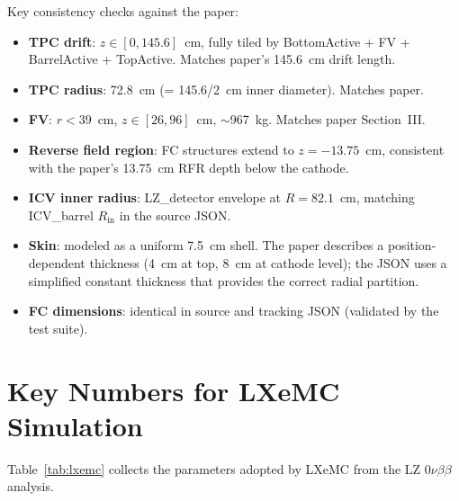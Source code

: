 \documentclass[11pt]{article}
\begin{document}
Key consistency checks against the paper:

\begin{itemize}
\item \textbf{TPC drift}: $z \in [0, 145.6]$~cm, fully tiled by
  BottomActive + FV + BarrelActive + TopActive.  Matches paper's
  145.6~cm drift length.

\item \textbf{TPC radius}: 72.8~cm (= 145.6/2~cm inner diameter).
  Matches paper.

\item \textbf{FV}: $r < 39$~cm, $z \in [26, 96]$~cm, $\sim$967~kg.
  Matches paper Section~III.

\item \textbf{Reverse field region}: FC structures extend to $z =
  -13.75$~cm, consistent with the paper's 13.75~cm RFR depth below
  the cathode.

\item \textbf{ICV inner radius}: LZ\_detector envelope at $R =
  82.1$~cm, matching ICV\_barrel $R_\text{in}$ in the source JSON.

\item \textbf{Skin}: modeled as a uniform 7.5~cm shell.  The paper
  describes a position-dependent thickness (4~cm at top, 8~cm at
  cathode level); the JSON uses a simplified constant thickness that
  provides the correct radial partition.

\item \textbf{FC dimensions}: identical in source and tracking JSON
  (validated by the test suite).
\end{itemize}

\section{Key Numbers for LXeMC Simulation}

Table~\ref{tab:lxemc} collects the parameters adopted by LXeMC from
the LZ $0\nu\beta\beta$ analysis.
\end{document}
